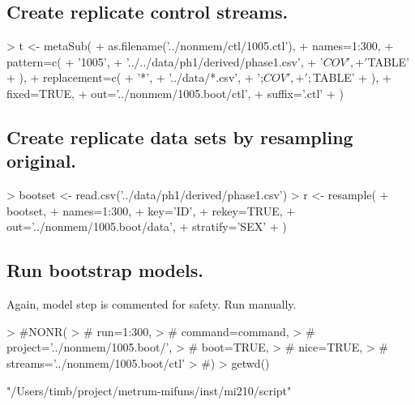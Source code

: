 \subsection{Create replicate control streams.}
\begin{Schunk}
\begin{Sinput}
> t <- metaSub(
+      as.filename('../nonmem/ctl/1005.ctl'),
+      names=1:300,
+      pattern=c(
+          '1005',
+          '../../data/ph1/derived/phase1.csv',
+          '$COV',
+          '$TABLE'
+      ),
+      replacement=c(
+          '*',
+          '../data/*.csv',
+          ';$COV',
+          ';$TABLE'
+     ),
+     fixed=TRUE,
+     out='../nonmem/1005.boot/ctl',
+     suffix='.ctl'
+  )
\end{Sinput}
\end{Schunk}
\subsection{Create replicate data sets by resampling original.}
\begin{Schunk}
\begin{Sinput}
>  bootset <- read.csv('../data/ph1/derived/phase1.csv')
>  r <- resample(
+  	bootset,
+  	names=1:300,
+  	key='ID',
+  	rekey=TRUE,
+  	out='../nonmem/1005.boot/data',
+  	stratify='SEX'
+  )
\end{Sinput}
\end{Schunk}
\subsection{Run bootstrap models.}
Again, model step is commented for safety.  Run manually.
\begin{Schunk}
\begin{Sinput}
> #NONR(
> #     run=1:300,
> #     command=command,
> #     project='../nonmem/1005.boot/',
> #     boot=TRUE,
> #     nice=TRUE,
> #     streams='../nonmem/1005.boot/ctl'
> #)
> getwd()  
\end{Sinput}
\begin{Soutput}
[1] "/Users/timb/project/metrum-mifuns/inst/mi210/script"
\end{Soutput}
\end{Schunk}
